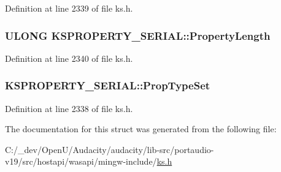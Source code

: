 Definition at line 2339 of file ks.\+h.

\subsubsection[{\texorpdfstring{Property\+Length}{PropertyLength}}]{\setlength{\rightskip}{0pt plus 5cm}U\+L\+O\+NG K\+S\+P\+R\+O\+P\+E\+R\+T\+Y\+\_\+\+S\+E\+R\+I\+A\+L\+::\+Property\+Length}\hypertarget{struct_k_s_p_r_o_p_e_r_t_y___s_e_r_i_a_l_a866564670e9e54eaaa898db8b938123f}{}\label{struct_k_s_p_r_o_p_e_r_t_y___s_e_r_i_a_l_a866564670e9e54eaaa898db8b938123f}


Definition at line 2340 of file ks.\+h.

\subsubsection[{\texorpdfstring{Prop\+Type\+Set}{PropTypeSet}}]{ K\+S\+P\+R\+O\+P\+E\+R\+T\+Y\+\_\+\+S\+E\+R\+I\+A\+L\+::\+Prop\+Type\+Set}\hypertarget{struct_k_s_p_r_o_p_e_r_t_y___s_e_r_i_a_l_ad0928d5b4c3338dd7d134aa3b4b4f79e}{}\label{struct_k_s_p_r_o_p_e_r_t_y___s_e_r_i_a_l_ad0928d5b4c3338dd7d134aa3b4b4f79e}


Definition at line 2338 of file ks.\+h.



The documentation for this struct was generated from the following file\+:\begin{DoxyCompactItemize}
\item 
C\+:/\+\_\+dev/\+Open\+U/\+Audacity/audacity/lib-\/src/portaudio-\/v19/src/hostapi/wasapi/mingw-\/include/\hyperlink{ks_8h}{ks.\+h}\end{DoxyCompactItemize}
